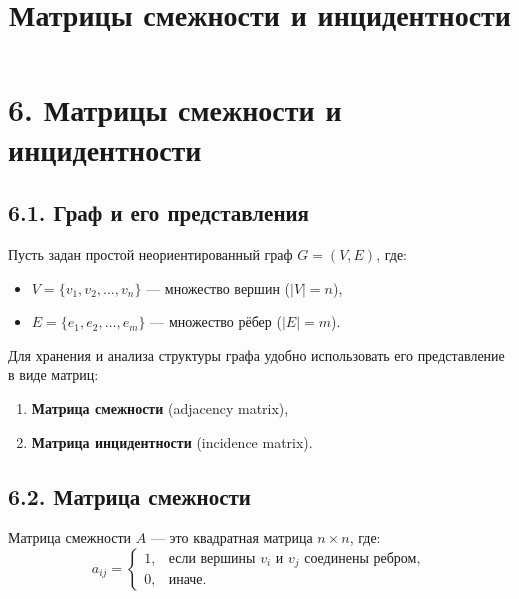 \documentclass{article}
\begin{document}
\title{Матрицы смежности и инцидентности}
\author{}
\date{}
\makeatletter
\renewcommand{\maketitle}{
  \begin{center}
    {\Large\mdseries\@title\par}
    \vspace{0.5em}
  \end{center}
}
\makeatother
\maketitle

\section*{6. Матрицы смежности и инцидентности}

\subsection*{6.1. Граф и его представления}

Пусть задан простой неориентированный граф $G = (V, E)$, где:
\begin{itemize}[leftmargin=*]
  \item $V = \{v_1, v_2, \dots, v_n\}$ — множество вершин ($|V| = n$),
  \item $E = \{e_1, e_2, \dots, e_m\}$ — множество рёбер ($|E| = m$).
\end{itemize}

Для хранения и анализа структуры графа удобно использовать его представление в виде матриц:
\begin{enumerate}[label=\arabic*)]
  \item \textbf{Матрица смежности} (adjacency matrix),
  \item \textbf{Матрица инцидентности} (incidence matrix).
\end{enumerate}

\subsection*{6.2. Матрица смежности}

Матрица смежности $A$ — это квадратная матрица $n \times n$, где:
\[
  a_{ij} = \begin{cases}
    1, & \text{если вершины } v_i \text{ и } v_j \text{ соединены ребром}, \\
    0, & \text{иначе}.
  \end{cases}
\]
\end{document}
